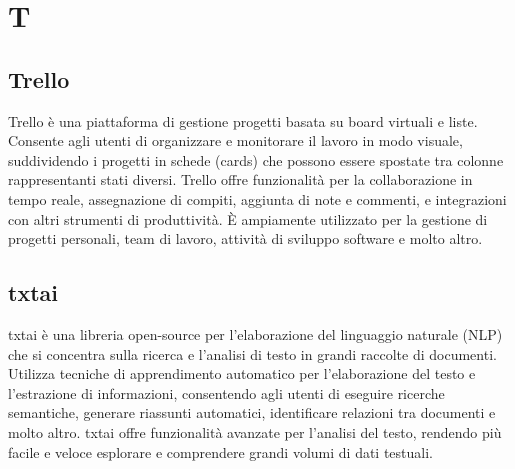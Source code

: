 \section{T}

\vspace{2em}
\subsection*{Trello}
Trello è una piattaforma di gestione progetti basata su board virtuali e liste. Consente agli utenti di organizzare e monitorare il lavoro in modo visuale, suddividendo i progetti in schede (cards) che possono essere spostate tra colonne rappresentanti stati diversi. Trello offre funzionalità per la collaborazione in tempo reale, assegnazione di compiti, aggiunta di note e commenti, e integrazioni con altri strumenti di produttività. È ampiamente utilizzato per la gestione di progetti personali, team di lavoro, attività di sviluppo software e molto altro.

\vspace{2em}
\subsection*{txtai}
txtai è una libreria open-source per l'elaborazione del linguaggio naturale (NLP) che si concentra sulla ricerca e l'analisi di testo in grandi raccolte di documenti. Utilizza tecniche di apprendimento automatico per l'elaborazione del testo e l'estrazione di informazioni, consentendo agli utenti di eseguire ricerche semantiche, generare riassunti automatici, identificare relazioni tra documenti e molto altro. txtai offre funzionalità avanzate per l'analisi del testo, rendendo più facile e veloce esplorare e comprendere grandi volumi di dati testuali.
